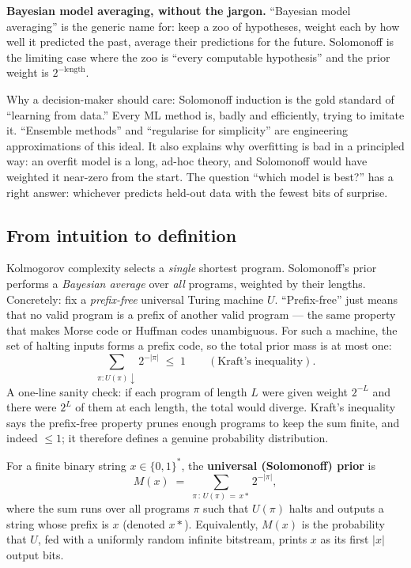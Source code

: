 \begin{intuition}
\textbf{Bayesian model averaging, without the jargon.}  ``Bayesian
model averaging'' is the generic name for: keep a zoo of hypotheses,
weight each by how well it predicted the past, average their
predictions for the future.  Solomonoff is the limiting case where
the zoo is ``every computable hypothesis'' and the prior weight is
$2^{-\text{length}}$.

Why a decision-maker should care: Solomonoff induction is the gold
standard of ``learning from data.''  Every ML method is, badly and
efficiently, trying to imitate it.  ``Ensemble methods'' and
``regularise for simplicity'' are engineering approximations of this
ideal.  It also explains why overfitting is bad in a principled way:
an overfit model is a long, ad-hoc theory, and Solomonoff would have
weighted it near-zero from the start.  The question ``which model is
best?'' has a right answer: whichever predicts held-out data with the
fewest bits of surprise.
\end{intuition}

\subsection*{From intuition to definition}

Kolmogorov complexity selects a \emph{single} shortest program.
Solomonoff's prior \citep{solomonoff1964formal} performs a
\emph{Bayesian average} over \emph{all} programs, weighted by their
lengths.  Concretely: fix a \emph{prefix-free} universal Turing
machine $U$.  ``Prefix-free'' just means that no valid program is a
prefix of another valid program --- the same property that makes
Morse code or Huffman codes unambiguous.  For such a machine, the
set of halting inputs forms a prefix code, so the total prior mass
is at most one:
\[
  \sum_{\pi : U(\pi)\downarrow} 2^{-|\pi|} \;\le\; 1
  \qquad(\text{Kraft's inequality}).
\]
A one-line sanity check: if each program of length $L$ were given
weight $2^{-L}$ and there were $2^L$ of them at each length,
the total would diverge.  Kraft's inequality says the prefix-free
property prunes enough programs to keep the sum finite, and indeed
$\le 1$; it therefore defines a genuine probability distribution.

\begin{definition}
\label{def:M}
For a finite binary string $x \in \{0,1\}^*$, the \textbf{universal
(Solomonoff) prior} is
\begin{equation}
  M(x) \;=\; \sum_{\pi \,:\, U(\pi)\, =\, x *} 2^{-|\pi|},
  \label{eq:M}
\end{equation}
where the sum runs over all programs $\pi$ such that $U(\pi)$ halts
and outputs a string whose prefix is $x$ (denoted $x*$).
Equivalently, $M(x)$ is the probability that $U$, fed with a
uniformly random infinite bitstream, prints $x$ as its first $|x|$
output bits.
\end{definition}

